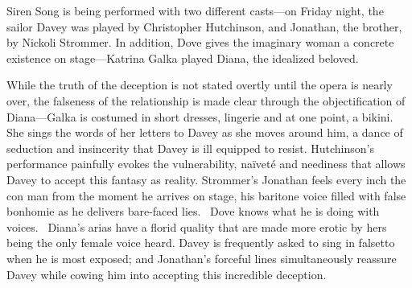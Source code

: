 Siren Song is being performed with two different casts—on Friday night, the sailor Davey was played by Christopher Hutchinson, and Jonathan, the brother, by Nickoli Strommer. In addition, Dove gives the imaginary woman a concrete existence on stage—Katrina Galka played Diana, the idealized beloved.

While the truth of the deception is not stated overtly until the opera is nearly over, the falseness of the relationship is made clear through the objectification of Diana—Galka is costumed in short dresses, lingerie and at one point, a bikini. She sings the words of her letters to Davey as she moves around him, a dance of seduction and insincerity that Davey is ill equipped to resist. Hutchinson’s performance painfully evokes the vulnerability, naïveté and neediness that allows Davey to accept this fantasy as reality. Strommer’s Jonathan feels every inch the con man from the moment he arrives on stage, his baritone voice filled with false bonhomie as he delivers bare-faced lies.  Dove knows what he is doing with voices.  Diana’s arias have a florid quality that are made more erotic by hers being the only female voice heard. Davey is frequently asked to sing in falsetto when he is most exposed; and Jonathan’s forceful lines simultaneously reassure Davey while cowing him into accepting this incredible deception.

